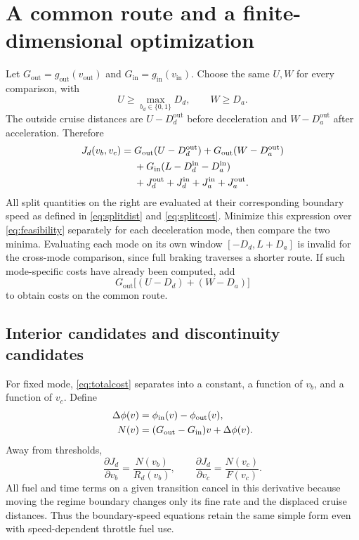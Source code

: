 \documentclass[conference,a4paper]{IEEEtran}
\newcommand{\out}{\mathrm{out}}
\newcommand{\inn}{\mathrm{in}}
\begin{document}
\section{A common route and a finite-dimensional optimization}
\label{sec:optimization}
Let $G_{\out}=g_{\out}(v_{\out})$ and $G_{\inn}=g_{\inn}(v_{\inn})$. Choose the same $U,W$ for every comparison, with
\begin{equation}
U\ge\max_{b_d\in\{0,1\}}D_d,\qquad W\ge D_a.
\end{equation}
The outside cruise distances are $U-D_d^{\out}$ before deceleration and $W-D_a^{\out}$ after acceleration. Therefore
\begin{align}
J_d(v_b,v_c)={}&G_{\out}(U-D_d^{\out})
 +G_{\out}(W-D_a^{\out})\notag\\
&+G_{\inn}(L-D_d^{\inn}-D_a^{\inn})\notag\\
&+J_d^{\out}+J_d^{\inn}+J_a^{\inn}+J_a^{\out}.
\label{eq:totalcost}
\end{align}
All split quantities on the right are evaluated at their corresponding boundary speed as defined in \eqref{eq:splitdist} and \eqref{eq:splitcost}.
Minimize this expression over \eqref{eq:feasibility} separately for each deceleration mode, then compare the two minima. Evaluating each mode on its own window $[-D_d,L+D_a]$ is invalid for the cross-mode comparison, since full braking traverses a shorter route. If such mode-specific costs have already been computed, add
\begin{equation}
G_{\out}\bigl[(U-D_d)+(W-D_a)\bigr]
\end{equation}
to obtain costs on the common route.

\subsection{Interior candidates and discontinuity candidates}
For fixed mode, \eqref{eq:totalcost} separates into a constant, a function of $v_b$, and a function of $v_c$. Define
\begin{align}
\Delta\phi(v)&=\phi_{\inn}(v)-\phi_{\out}(v),\notag\\
N(v)&=(G_{\out}-G_{\inn})v+\Delta\phi(v).
\end{align}
Away from thresholds,
\begin{equation}
\frac{\partial J_d}{\partial v_b}=\frac{N(v_b)}{R_d(v_b)},\qquad
\frac{\partial J_d}{\partial v_c}=\frac{N(v_c)}{F(v_c)}.
\label{eq:partials}
\end{equation}
All fuel and time terms on a given transition cancel in this derivative because moving the regime boundary changes only its fine rate and the displaced cruise distances. Thus the boundary-speed equations retain the same simple form even with speed-dependent throttle fuel use.
\end{document}
